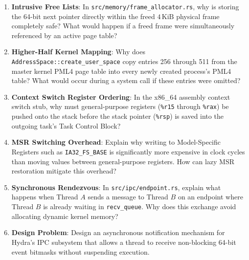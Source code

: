 \begin{enumerate}
    \item \textbf{Intrusive Free Lists}: In \texttt{src/memory/frame\_allocator.rs}, why is storing the 64-bit next pointer directly within the freed $4\,\text{KiB}$ physical frame completely safe? What would happen if a freed frame were simultaneously referenced by an active page table?
    \item \textbf{Higher-Half Kernel Mapping}: Why does \texttt{AddressSpace::create\_user\_space} copy entries 256 through 511 from the master kernel PML4 page table into every newly created process's PML4 table? What would occur during a system call if these entries were omitted?
    \item \textbf{Context Switch Register Ordering}: In the x86\_64 assembly context switch stub, why must general-purpose registers (\texttt{\%r15} through \texttt{\%rax}) be pushed onto the stack before the stack pointer (\texttt{\%rsp}) is saved into the outgoing task's Task Control Block?
    \item \textbf{MSR Switching Overhead}: Explain why writing to Model-Specific Registers such as \texttt{IA32\_FS\_BASE} is significantly more expensive in clock cycles than moving values between general-purpose registers. How can lazy MSR restoration mitigate this overhead?
    \item \textbf{Synchronous Rendezvous}: In \texttt{src/ipc/endpoint.rs}, explain what happens when Thread $A$ sends a message to Thread $B$ on an endpoint where Thread $B$ is already waiting in \texttt{recv\_queue}. Why does this exchange avoid allocating dynamic kernel memory?
    \item \textbf{Design Problem}: Design an asynchronous notification mechanism for Hydra's IPC subsystem that allows a thread to receive non-blocking 64-bit event bitmasks without suspending execution.
\end{enumerate}
